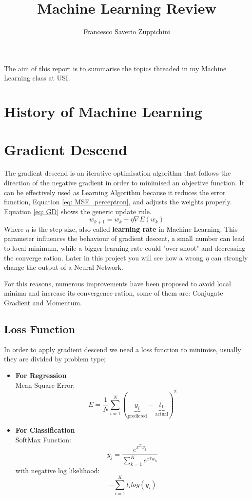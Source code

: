 \documentclass[11pt]{article}
\title{Machine Learning Review}
\author{Francesco Saverio Zuppichini}
\begin{document}
\maketitle
The aim of this report is to summarise the topics threaded in my Machine Learning class at USI.
\section{History of Machine Learning}

\section{Gradient Descend}
The gradient descend is an iterative optimisation algorithm that follows the direction of the negative gradient in order to minimised an objective function. It can be effectively used as Learning Algorithm because it reduces the error function, Equation \ref{eq: MSE_perceptron}, and adjusts the weights properly. Equation \ref{eq: GD} shows the generic update rule.
\begin{equation}
	w_{k + 1} = w_k - \eta \nabla E(w_k)
	\label{eq: gradient_descent}
\end{equation}
Where $\eta$ is the step size, also called \textbf{learning rate} in Machine Learning. This parameter influences the behaviour of gradient descent, a small number can lead to local minimum, while a bigger learning rate could "over-shoot" and decreasing the converge ration. Later in this project you will see how a wrong $\eta$ can strongly change the output of a Neural Network.

For this reasons, numerous improvements have been proposed to avoid local minima and increase its convergence ration, some of them are: Conjugate Gradient and Momentum.
\subsection{Loss Function}
In order to apply gradient descend we need a loss function to minimise, usually they are divided by problem type;

\begin{itemize}
	\item \textbf{For Regression} \\
	Mean Square Error: \\
	\begin{equation}
	E = \frac{1}{N}\sum_{i=1}^N(\underbrace{y_i}_{\text{predicted}} - \underbrace{t_1}_{\text{actual}})^2
	\label{eq: MSE}	
	\end{equation}
	\item \textbf{For Classification} \\
	SoftMax Function:
	\begin{equation}
	y_j = \frac{e^{x^Tw_j}}{\sum_{k = 1}^K e^{x^Tw_k}}
	\label{eq: soft_max}	
	\end{equation}
	with negative log likelihood:\\
	\begin{equation}
	- \sum_{i = 1}^K t_ilog(y_i)
	\label{eq: log_like}
	\end{equation}
	
\end{itemize}
\end{document}
